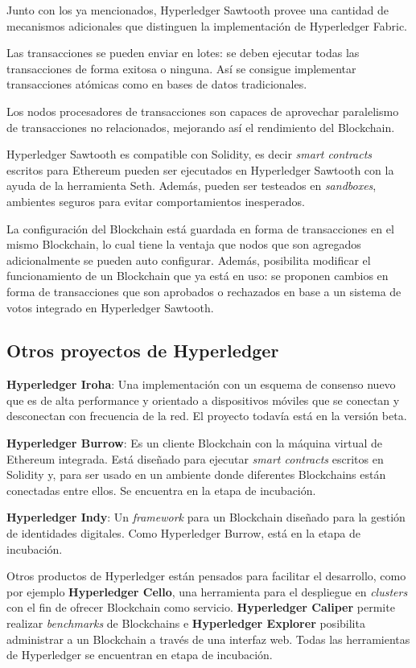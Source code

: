 Junto con los ya mencionados, Hyperledger Sawtooth provee una cantidad de mecanismos adicionales que distinguen la implementación de Hyperledger Fabric.

Las transacciones se pueden enviar en lotes: se deben ejecutar todas las transacciones de forma exitosa o ninguna. Así se consigue implementar transacciones atómicas como en  bases de datos tradicionales.

Los nodos procesadores de transacciones son capaces de aprovechar paralelismo de transacciones no relacionados, mejorando así el rendimiento del Blockchain.

Hyperledger Sawtooth es compatible con Solidity, es decir \textit{smart contracts} escritos para Ethereum pueden ser ejecutados en Hyperledger Sawtooth con la ayuda de la herramienta Seth. Además, pueden ser testeados en \textit{sandboxes}, ambientes seguros para evitar comportamientos inesperados.

La configuración del Blockchain está guardada en forma de transacciones en el mismo Blockchain, lo cual tiene la ventaja que nodos que son agregados adicionalmente se pueden auto configurar. Además, posibilita modificar el funcionamiento de un Blockchain que ya está en uso: se proponen cambios en forma de transacciones que son aprobados o rechazados en base a un sistema de votos integrado en Hyperledger Sawtooth.


\subsection{Otros proyectos de Hyperledger}

\textbf{Hyperledger Iroha}: Una implementación con un esquema de consenso nuevo que es de alta performance y orientado a dispositivos móviles que se conectan y desconectan con frecuencia de la red. El proyecto todavía está en la versión beta.


\textbf{Hyperledger Burrow}: Es un cliente Blockchain con la máquina virtual de Ethereum integrada. Está diseñado para ejecutar \textit{smart contracts} escritos en Solidity y, para ser usado en un ambiente donde diferentes Blockchains están conectadas entre ellos. Se encuentra en la etapa de incubación. 

\textbf{Hyperledger Indy}: Un \textit{framework} para un Blockchain diseñado para la gestión de identidades digitales. Como Hyperledger Burrow, está en la etapa de incubación.

Otros productos de Hyperledger están pensados para facilitar el desarrollo, como por ejemplo \textbf{Hyperledger Cello}, una herramienta para el despliegue en \textit{clusters} con el fin de ofrecer Blockchain como servicio. \textbf{Hyperledger Caliper} permite realizar \textit{benchmarks} de Blockchains e \textbf{Hyperledger Explorer} posibilita administrar a un Blockchain a través de una interfaz web. Todas las herramientas de Hyperledger se encuentran en etapa de incubación.

